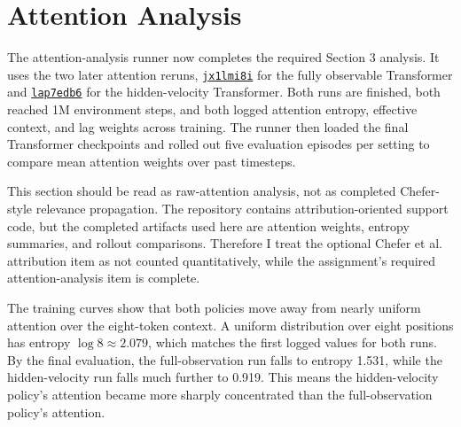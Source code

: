 \documentclass[11pt]{article}
\begin{document}
\section{Attention Analysis}

The attention-analysis runner now completes the required Section 3 analysis. It uses the two later attention reruns, \href{https://wandb.ai/krishsachdev246-bits-pilani/saidl-rl/runs/jx1lmi8i}{\texttt{jx1lmi8i}} for the fully observable Transformer and \href{https://wandb.ai/krishsachdev246-bits-pilani/saidl-rl/runs/lap7edb6}{\texttt{lap7edb6}} for the hidden-velocity Transformer. Both runs are finished, both reached 1M environment steps, and both logged attention entropy, effective context, and lag weights across training. The runner then loaded the final Transformer checkpoints and rolled out five evaluation episodes per setting to compare mean attention weights over past timesteps.

This section should be read as raw-attention analysis, not as completed Chefer-style relevance propagation. The repository contains attribution-oriented support code, but the completed artifacts used here are attention weights, entropy summaries, and rollout comparisons. Therefore I treat the optional Chefer et al. attribution item as not counted quantitatively, while the assignment's required attention-analysis item is complete.

\begin{table}[!htbp]
\centering
\scriptsize
\caption{Completed attention-analysis runs and rollout summaries. Training entropy is logged over W\&B evaluation points; rollout return and rollout entropy are computed from five final-checkpoint episodes.}
\label{tab:attention-completed}
\end{table}

The training curves show that both policies move away from nearly uniform attention over the eight-token context. A uniform distribution over eight positions has entropy $\log 8 \approx 2.079$, which matches the first logged values for both runs. By the final evaluation, the full-observation run falls to entropy 1.531, while the hidden-velocity run falls much further to 0.919. This means the hidden-velocity policy's attention became more sharply concentrated than the full-observation policy's attention.
\end{document}
